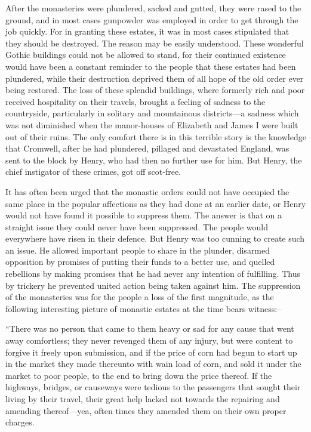 \documentclass{book}
\begin{document}
After the monasteries were plundered, sacked and gutted, they were rased to the ground, and in most cases gunpowder was employed in order to get through the job quickly. For in granting these estates, it was in most cases stipulated that they should be destroyed. The reason may be easily understood. These wonderful Gothic buildings could not be allowed to stand, for their continued existence would have been a constant reminder to the people that these estates had been plundered, while their destruction deprived them of all hope of the old order ever being restored. The loss of these splendid buildings, where formerly rich and poor received hospitality on their travels, brought a feeling of sadness to the countryside, particularly in solitary and mountainous districts—a sadness which was not diminished when the manor-houses of Elizabeth and James I were built out of their ruins. The only comfort there is in this terrible story is the knowledge that Cromwell, after he had plundered, pillaged and devastated England, was sent to the block by Henry, who had then no further use for him. But Henry, the chief instigator of these crimes, got off scot-free.

It has often been urged that the monastic orders could not have occupied the same place in the popular affections as they had done at an earlier date, or Henry would not have found it possible to suppress them. The answer is that on a straight issue they could never have been suppressed. The people would everywhere have risen in their defence. But Henry was too cunning to create such an issue. He allowed important people to share in the plunder, disarmed opposition by promises of putting their funds to a better use, and quelled rebellions by making promises that he had never any intention of fulfilling. Thus by trickery he prevented united action being taken against him. The suppression of the monasteries was for the people a loss of the first magnitude, as the following interesting picture of monastic estates at the time bears witness:–

“There was no person that came to them heavy or sad for any cause that went away comfortless; they never revenged them of any injury, but were content to forgive it freely upon submission, and if the price of corn had begun to start up in the market they made thereunto with wain load of corn, and sold it under the market to poor people, to the end to bring down the price thereof. If the highways, bridges, or causeways were tedious to the passengers that sought their living by their travel, their great help lacked not towards the repairing and amending thereof—yea, often times they amended them on their own proper charges.
\end{document}
